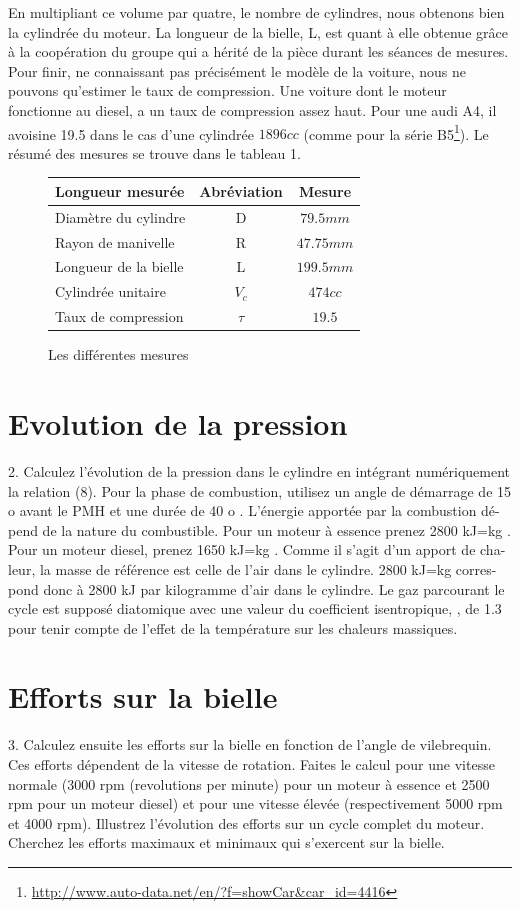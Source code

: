 \documentclass[a4paper,oneside,12pt]{report}
\begin{document}
En multipliant ce volume par quatre, le nombre de cylindres, nous obtenons bien la cylindrée du moteur. La longueur de la bielle, L, est quant à elle obtenue grâce à la coopération du groupe qui a hérité de la pièce durant les séances de mesures. Pour finir, ne connaissant pas précisément le modèle de la voiture, nous ne pouvons qu'estimer le taux de compression. Une voiture dont le moteur fonctionne au diesel, a un taux de compression assez haut. Pour une audi A4, il avoisine 19.5 dans le cas d'une cylindrée $1896 cc$ (comme pour la série 
B5\footnote{\url{http://www.auto-data.net/en/?f=showCar&car_id=4416}}). Le résumé des mesures se trouve dans le tableau 1.

\begin{figure}[h]
\centering
\begin{tabular}{|l|c|c|}
  \hline
  Longueur mesurée & Abréviation & Mesure\\
  \hline
  Diamètre du cylindre & D & $79.5mm$ \\
  Rayon de manivelle & R & $47.75mm$\\
  Longueur de la bielle & L & $199.5mm$\\
  Cylindrée unitaire & $V_c$  & $474cc$\\
  Taux de compression & $\tau$ & $19.5$\\
  \hline
\end{tabular}
\caption{Les différentes mesures}
\end{figure}

\section{Evolution de la pression}
2. Calculez l’évolution de la pression dans le cylindre en intégrant numériquement
la relation (8). Pour la phase de combustion, utilisez un angle de démarrage de
15
o
avant le PMH et une durée de
40
o
. L’énergie apportée par la combustion dé-
pend de la nature du combustible. Pour un moteur à essence prenez
2800
kJ=kg
.
Pour un moteur diesel, prenez
1650
kJ=kg
. Comme il s’agit d’un apport de cha-
leur, la masse de référence est celle de l’air dans le cylindre.
2800
kJ=kg
corres-
pond donc à
2800
kJ
par kilogramme d’air dans le cylindre. Le gaz parcourant
le cycle est supposé diatomique avec une valeur du coefficient isentropique,
,
de 1.3 pour tenir compte de l’effet de la température sur les chaleurs massiques.

\section{Efforts sur la bielle}
3. Calculez ensuite les efforts sur la bielle en fonction de l’angle de vilebrequin.
Ces efforts dépendent de la vitesse de rotation. Faites le calcul pour une vitesse
normale (3000 rpm (revolutions per minute) pour un moteur à essence et 2500
rpm pour un moteur diesel) et pour une vitesse élevée (respectivement 5000 rpm
et 4000 rpm). Illustrez l’évolution des efforts sur un cycle complet du moteur.
Cherchez les efforts maximaux et minimaux qui s’exercent sur la bielle.
\end{document}
